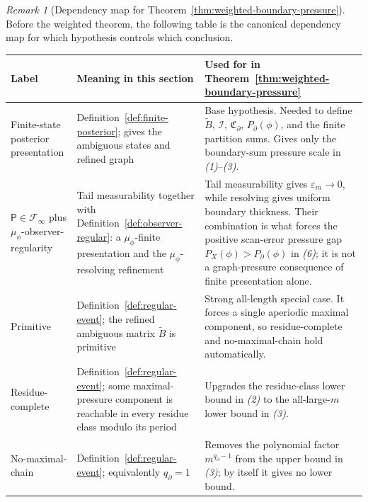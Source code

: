 \documentclass{etds}%
\numberwithin{equation}{section}
\theoremstyle{plain}
\theoremstyle{definition}
\theoremstyle{remark}
\newtheorem{remark}[theorem]{Remark}
\begin{document}
\begin{remark}[Dependency map for Theorem~\ref{thm:weighted-boundary-pressure}]
\label{rem:weighted-hypothesis-map}
Before the weighted theorem, the following table is the canonical dependency
map for which hypothesis controls which conclusion.
\begin{center}
\renewcommand{\arraystretch}{1.15}
\begin{tabular}{@{}>{\raggedright\arraybackslash}p{1.35in}>{\raggedright\arraybackslash}p{1.85in}>{\raggedright\arraybackslash}p{2.45in}@{}}
\toprule
Label & Meaning in this section & Used for in Theorem~\ref{thm:weighted-boundary-pressure} \\
\midrule
Finite-state posterior presentation & Definition~\ref{def:finite-posterior}; gives the ambiguous states and refined graph & Base hypothesis.  Needed to define $\widetilde B$, $\mathcal{I}$, $\mathfrak{C}_\partial$, $P_\partial(\phi)$, and the finite partition sums.  Gives only the boundary-sum pressure scale in \emph{(1)}--\emph{(3)}. \\
$\mathsf{P}\in\mathcal{F}_\infty$ plus $\mu_\phi$-observer-regularity & Tail measurability together with Definition~\ref{def:observer-regular}: a $\mu_\phi$-finite presentation and the $\mu_\phi$-resolving refinement & Tail measurability gives $\varepsilon_m\to0$, while resolving gives uniform boundary thickness.  Their combination is what forces the positive scan-error pressure gap $P_X(\phi)>P_\partial(\phi)$ in \emph{(6)}; it is not a graph-pressure consequence of finite presentation alone. \\
Primitive & Definition~\ref{def:regular-event}; the refined ambiguous matrix $\widetilde B$ is primitive & Strong all-length special case.  It forces a single aperiodic maximal component, so residue-complete and no-maximal-chain hold automatically. \\
Residue-complete & Definition~\ref{def:regular-event}; some maximal-pressure component is reachable in every residue class modulo its period & Upgrades the residue-class lower bound in \emph{(2)} to the all-large-$m$ lower bound in \emph{(3)}. \\
No-maximal-chain & Definition~\ref{def:regular-event}; equivalently $q_\partial=1$ & Removes the polynomial factor $m^{q_\partial-1}$ from the upper bound in \emph{(3)}; by itself it gives no lower bound. \\
\bottomrule
\end{tabular}
\end{center}
\end{remark}
\end{document}
